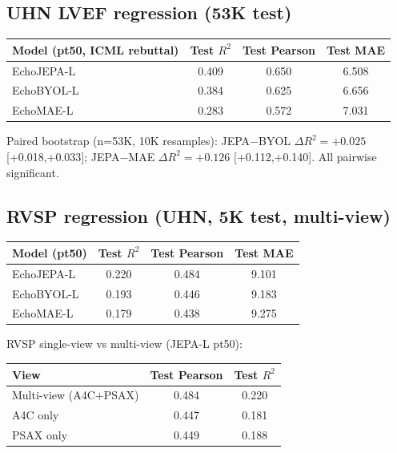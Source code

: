 \documentclass{article}
\begin{document}
\subsection{UHN LVEF regression (53K test)}\label{sec:uhn_lvef}

\begin{center}
\begin{tabular}{lccc}
\toprule
Model (pt50, ICML rebuttal) & Test $R^2$ & Test Pearson & Test MAE \\
\midrule
EchoJEPA-L & 0.409 & 0.650 & 6.508 \\
EchoBYOL-L & 0.384 & 0.625 & 6.656 \\
EchoMAE-L  & 0.283 & 0.572 & 7.031 \\
\bottomrule
\end{tabular}
\end{center}

Paired bootstrap (n=53K, 10K resamples): JEPA$-$BYOL $\Delta R^2=+0.025$ [+0.018,+0.033]; JEPA$-$MAE $\Delta R^2=+0.126$ [+0.112,+0.140]. All pairwise significant.

\subsection{RVSP regression (UHN, 5K test, multi-view)}\label{sec:rvsp}

\begin{center}
\begin{tabular}{lccc}
\toprule
Model (pt50) & Test $R^2$ & Test Pearson & Test MAE \\
\midrule
EchoJEPA-L & 0.220 & 0.484 & 9.101 \\
EchoBYOL-L & 0.193 & 0.446 & 9.183 \\
EchoMAE-L  & 0.179 & 0.438 & 9.275 \\
\bottomrule
\end{tabular}
\end{center}

RVSP single-view vs multi-view (JEPA-L pt50):
\begin{center}
\begin{tabular}{lcc}
\toprule
View & Test Pearson & Test $R^2$ \\
\midrule
Multi-view (A4C+PSAX) & 0.484 & 0.220 \\
A4C only              & 0.447 & 0.181 \\
PSAX only             & 0.449 & 0.188 \\
\bottomrule
\end{tabular}
\end{center}
\end{document}
